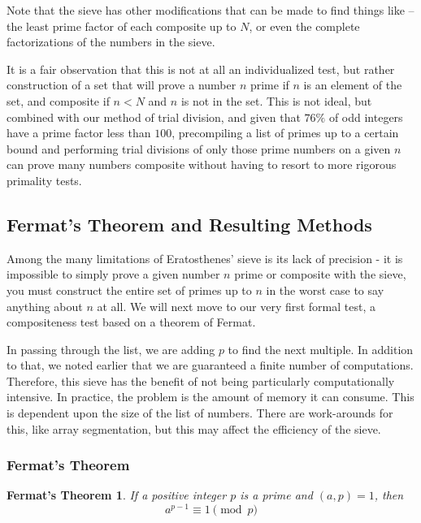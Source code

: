 \documentclass{article}
\begin{document}
\par Note that the sieve has other modifications that can be made to find things like -- the least prime factor of each composite up to $N$, or even the complete factorizations of the numbers in the sieve.

\par It is a fair observation that this is not at all an individualized test, but rather construction of a set that will prove a number $n$ prime if $n$ is an element of the set, and composite if $n < N$ and $n$ is not in the set. This is not ideal, but combined with our method of trial division, and given that $76\%$ of odd integers have a prime factor less than $100$, precompiling a list of primes up to a certain bound and performing trial divisions of only those prime numbers on a given $n$ can prove many numbers composite without having to resort to more rigorous primality tests.

\subsection* {Fermat's Theorem and Resulting Methods}

\par Among the many limitations of Eratosthenes' sieve is its lack of precision - it is impossible to simply prove a given number $n$ prime or composite with the sieve, you must construct the entire set of primes up to $n$ in the worst case to say anything about $n$ at all. We will next move to our very first formal test, a compositeness test based on a theorem of Fermat.

\par In passing through the list, we are adding $p$ to find the next multiple. In addition to that, we noted earlier that we are guaranteed a finite number of computations. Therefore, this sieve has the benefit of not being particularly computationally intensive. In practice, the problem is the amount of memory it can consume. This is dependent upon the size of the list of numbers. There are work-arounds for this, like array segmentation, but this may affect the efficiency of the sieve.

\subsubsection*{Fermat's Theorem}

\newtheorem*{fermattheorem}{Fermat's Theorem}
\begin{fermattheorem}
If a positive integer $p$ is a prime and $(a,p) = 1$, then
	$$a^{p-1} \equiv 1 \pmod p$$
\end{fermattheorem}
\end{document}
